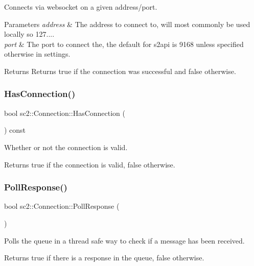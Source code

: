 Connects via websocket on a given address/port. 
\begin{DoxyParams}{Parameters}
{\em address} & The address to connect to, will most commonly be used locally so 127.... \\
\hline
{\em port} & The port to connect the, the default for s2api is 9168 unless specified otherwise in settings. \\
\hline
\end{DoxyParams}
\begin{DoxyReturn}{Returns}
Returns true if the connection was successful and false otherwise. 
\end{DoxyReturn}
\mbox{\label{classsc2_1_1_connection_a69ca71e72ab2a0a1bad36fc729fedc02}} 
\subsubsection{\texorpdfstring{Has\+Connection()}{HasConnection()}}
{\footnotesize\ttfamily bool sc2\+::\+Connection\+::\+Has\+Connection (\begin{DoxyParamCaption}{ }\end{DoxyParamCaption}) const}

Whether or not the connection is valid. \begin{DoxyReturn}{Returns}
true if the connection is valid, false otherwise. 
\end{DoxyReturn}
\mbox{\label{classsc2_1_1_connection_a7c06854ac5724952f69fb229a3defcee}} 
\subsubsection{\texorpdfstring{Poll\+Response()}{PollResponse()}}
{\footnotesize\ttfamily bool sc2\+::\+Connection\+::\+Poll\+Response (\begin{DoxyParamCaption}{ }\end{DoxyParamCaption})}

Polls the queue in a thread safe way to check if a message has been received. \begin{DoxyReturn}{Returns}
true if there is a response in the queue, false otherwise. 
\end{DoxyReturn}
\mbox{\label{classsc2_1_1_connection_af2d5cf1aff2fef4d30ddd9ab256419ed}} 
